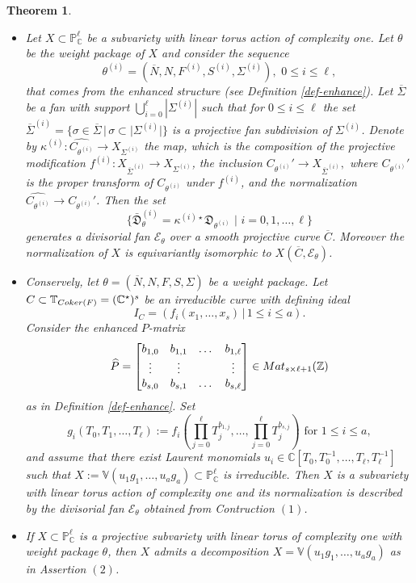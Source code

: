 \documentclass[11pt, reqno]{amsart}
\theoremstyle{plain}
\newtheorem{theorem}{Theorem}[section]
\theoremstyle{definition}
\theoremstyle{remark}
\begin{document}
\begin{theorem}\label{theo-main-nonnorm}
\begin{itemize}
\item[(1)] Let $X\subset \mathbb{P}^{\ell}_{\mathbb{C}}$ be a subvariety with linear torus action of complexity one. Let $\theta$ be the weight package of $X$ and consider the sequence 
$$\theta^{(i)} =  (\overline{N}, N, F^{(i)}, S^{(i)}, \Sigma^{(i)}),\,\, 0\leq i\leq \ell,$$ that comes from the enhanced structure (see Definition  \ref{def-enhance}).
Let $\overline{\Sigma}$ be a fan with support $\bigcup_{i =  0}^{\ell}|\Sigma^{(i)}|$ such that for $0\leq i\leq \ell$
the set
$\overline{\Sigma}^{(i)} =  \{\sigma \in \overline{\Sigma}\,|\, \sigma \subset |\Sigma^{(i)}|\}$
is a projective fan subdivision of $\Sigma^{(i)}$. Denote by $\kappa^{(i)}: \widehat{C_{\theta^{(i)}}}\rightarrow X_{\Sigma^{(i)}}$ the map, which is the composition of the projective modification $f^{(i)}: X_{\overline{\Sigma}^{(i)}}\rightarrow X_{\Sigma^{(i)}}$, the inclusion $C_{\theta^{(i)}}'\rightarrow X_{\overline{\Sigma}^{(i)}},$ where $C_{\theta^{(i)}}'$ is the proper transform of $C_{\theta^{(i)}}$ under $f^{(i)}$, and the normalization 
$\widehat{C_{\theta^{(i)}}}\rightarrow C_{\theta^{(i)}}'$. 
Then the set
$$\{\bar{\mathfrak{D}}_{\theta}^{(i)} =  \kappa^{(i) \star}\mathfrak{D}_{\theta^{(i)}}\,\,|\,\, i =  0,1, \ldots, \ell\}$$
generates  a divisorial fan $\mathscr{E}_{\theta}$ over a smooth projective curve $\overline{C}$. Moreover the normalization of $X$ is equivariantly isomorphic to $X(\overline{C},\mathscr{E}_{\theta})$.
\item[(2)] Conservely, let $\theta =  (\overline{N}, N, F, S, \Sigma)$ be a weight package. Let $C\subset \mathbb{T}_{{\rm Coker}(F)} =  (\mathbb{C}^{\star})^{s}$ be an irreducible curve with defining ideal
$$I_{C} =  (f_{i}(x_{1}, \ldots, x_{s})\,|\, 1\leq i\leq a).$$
Consider the enhanced $P$-matrix 
$$\widehat{P} =   \begin{bmatrix} 
    b_{1,0} & b_{1,1} & \dots & b_{1, \ell}\\
    \vdots &  \vdots &     & \vdots  \\
    b_{s, 0} & b_{s,1} & \dots & b_{s, \ell}
    \end{bmatrix}\in {\rm Mat}_{s\times \ell + 1}(\mathbb{Z})$$
as in Definition \ref{def-enhance}. Set 
$$g_{i}(T_{0},T_{1}, \ldots, T_{\ell}):= f_{i}\left(\prod_{j = 0}^{\ell}T_{j}^{b_{1, j}}, \ldots, \prod_{j = 0}^{\ell}T_{j}^{b_{s, j}}\right)\text{ for } 1\leq i\leq a,$$
and assume that there exist Laurent monomials $u_{i}\in \mathbb{C}[T_{0}, T_{0}^{-1}, \ldots, T_{\ell}, T_{\ell}^{-1}]$ 
such that $X:= \mathbb{V}(u_{1}g_{1}, \ldots, u_{a}g_{a})\subset \mathbb{P}^{\ell}_{\mathbb{C}}$ is irreducible. Then $X$ is a subvariety with linear torus action of complexity one and its normalization is described by the divisorial fan $\mathscr{E}_{\theta}$ obtained from Contruction $(1)$. 
\item[$(3)$] If $X \subset \mathbb{P}^{\ell}_{\mathbb{C}}$ is a projective subvariety with linear torus of complexity one with weight package $\theta$, then $X$ admits a decomposition $X  =  \mathbb{V}(u_{1}g_{1}, \ldots, u_{a}g_{a})$ as in Assertion $(2)$. 
\end{itemize}
\end{theorem}
\end{document}
